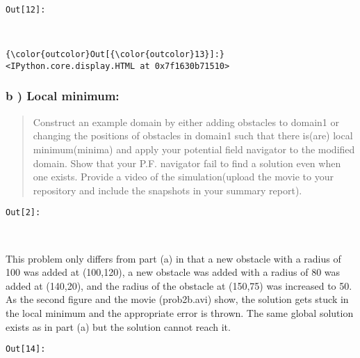 \documentclass{article}
\begin{document}
\texttt{\color{outcolor}Out[{\color{outcolor}12}]:}
    
    \begin{center}
    \end{center}
    { \hspace*{\fill} \\}
    


            \begin{Verbatim}[commandchars=\\\{\}]
{\color{outcolor}Out[{\color{outcolor}13}]:} <IPython.core.display.HTML at 0x7f1630b71510>
\end{Verbatim}
        

    \subsubsection{b ) Local minimum:}


    \begin{quote}
Construct an example domain by either adding obstacles to domain1 or
changing the positions of obstacles in domain1 such that there is(are)
local minimum(minima) and apply your potential field navigator to the
modified domain. Show that your P.F. navigator fail to find a solution
even when one exists. Provide a video of the simulation(upload the movie
to your repository and include the snapshots in your summary report).
\end{quote}

\texttt{\color{outcolor}Out[{\color{outcolor}2}]:}
    
    \begin{center}
    \end{center}
    { \hspace*{\fill} \\}
    

    This problem only differs from part (a) in that a new obstacle with a
radius of 100 was added at (100,120), a new obstacle was added with a
radius of 80 was added at (140,20), and the radius of the obstacle at
(150,75) was increased to 50. As the second figure and the movie
(prob2b.avi) show, the solution gets stuck in the local minimum and the
appropriate error is thrown. The same global solution exists as in part
(a) but the solution cannot reach it.

\texttt{\color{outcolor}Out[{\color{outcolor}14}]:}
    
\end{document}
